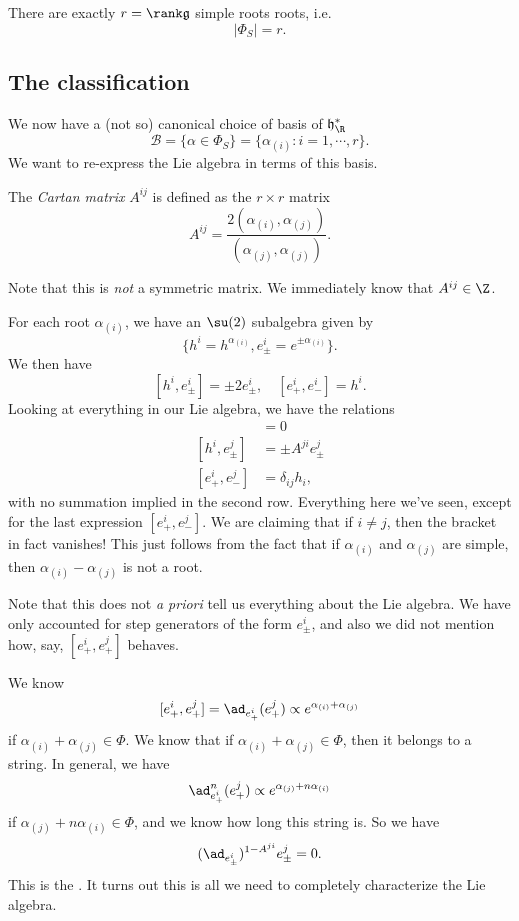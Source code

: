 \documentclass[a4paper]{article}
\begin{document}
\begin{cor}
  There are exactly $r = \rank \mathfrak{g}$ simple roots roots, i.e.
  \[
    |\Phi_S| = r.
  \]
\end{cor}

\subsection{The classification}
We now have a (not so) canonical choice of basis of $\mathfrak{h}_\R^*$
\[
  \mathcal{B} = \{\alpha \in \Phi_S\} = \{\alpha_{(i)}: i = 1, \cdots, r\}.
\]
We want to re-express the Lie algebra in terms of this basis.
\begin{defi}
  The \emph{Cartan matrix} $A^{ij}$ is defined as the $r \times r$ matrix
  \[
    A^{ij} = \frac{2(\alpha_{(i)}, \alpha_{(j)})}{(\alpha_{(j)}, \alpha_{(j)})}.
  \]
\end{defi}
Note that this is \emph{not} a symmetric matrix. We immediately know that $A^{ij} \in \Z$.

For each root $\alpha_{(i)}$, we have an $\su(2)$ subalgebra given by
\[
  \{h^i = h^{\alpha_{(i)}}, e_{\pm}^i = e^{\pm \alpha_{(i)}}\}.
\]
We then have
\[
  [h^i, e_{\pm}^i] = \pm 2 e^i_{\pm},\quad [e_+^i, e_-^i] = h^i.
\]
Looking at everything in our Lie algebra, we have the relations
\begin{align*}
  [h^i, h^j] &= 0\\
  [h^i, e^j_{\pm}] &= \pm A^{ji} e^j_{\pm}\\
  [e_+^i, e_-^j] &= \delta_{ij} h_i,
\end{align*}
with no summation implied in the second row. Everything here we've seen, except for the last expression $[e_+^i, e_-^j]$. We are claiming that if $i \not= j$, then the bracket in fact vanishes! This just follows from the fact that if $\alpha_{(i)}$ and $\alpha_{(j)}$ are simple, then $\alpha_{(i)} - \alpha_{(j)}$ is not a root.

Note that this does not \emph{a priori} tell us everything about the Lie algebra. We have only accounted for step generators of the form $e_{\pm}^i$, and also we did not mention how, say, $[e_+^i, e_+^j]$ behaves.

We know
\[
  [e_+^i, e_+^j] = \ad_{e^i_+}(e_+^j) \propto e^{\alpha_{(i)} + \alpha_{(j)}}
\]
if $\alpha_{(i)} + \alpha_{(j)} \in \Phi$. We know that if $\alpha_{(i)} + \alpha_{(j)} \in \Phi$, then it belongs to a string. In general, we have
\[
  \ad_{e_+^i}^n (e_+^j) \propto e^{\alpha_{(j)} + n \alpha_{(i)}}
\]
if $\alpha_{(j)} + n \alpha_{(i)} \in \Phi$, and we know how long this string is. So we have
\[
  (\ad_{e_{\pm}^i})^{1 - A^{ji}} e^j_{\pm} = 0.
\]
This is the . It turns out this is all we need to completely characterize the Lie algebra.
\end{document}
